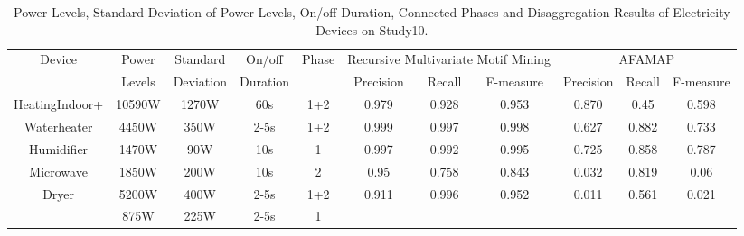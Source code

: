 \begin{table*}[!t]
\renewcommand{\arraystretch}{1.3}
\caption{Power Levels, Standard Deviation of Power Levels, On/off Duration, Connected Phases and Disaggregation Results of Electricity Devices on Study10.}
\label{table_study10results}
\centering
\small
\setlength\tabcolsep{2pt}
\begin{tabular}{|c|c|c|c|c|c|c|c|c|c|c|}
\hline
\multirow{2}{*}{Device} & Power & Standard & On/off &  \multirow{2}{*}{Phase} & \multicolumn{3}{|c|}{Recursive Multivariate Motif Mining} & \multicolumn{3}{|c|}{AFAMAP}\\
\cline{6-11}
           &  Levels & Deviation & Duration &  &Precision&  Recall &  F-measure & Precision & Recall & F-measure\\ 
\hline
\hline
\multirow{2}{*}{HeatingIndoor+} & \multirow{2}{*}{10590W} & \multirow{2}{*}{1270W} & \multirow{2}{*}{60s} & \multirow{2}{*}{1+2} & \multirow{2}{*}{0.979} & \multirow{2}{*}{0.928} & \multirow{2}{*}{0.953} & \multirow{2}{*}{0.870}& \multirow{2}{*}{0.45} & \multirow{2}{*}{0.598}\\
HeatingOutdoor &  &  &  &  &  &  &  &  & & \\
\hline
Waterheater & 4450W & 350W &  2-5s & 1+2 & 0.999 & 0.997 &0.998 &0.627& 0.882 &0.733\\
\hline
Humidifier & 1470W & 90W & 10s & 1 & 0.997 & 0.992 &0.995 & 0.725 & 0.858 & 0.787\\
\hline
Microwave & 1850W & 200W & 10s & 2 & 0.95 &0.758 & 0.843 & 0.032 & 0.819 & 0.06\\
\hline
\multirow{2}{*}{Dryer} & 5200W &400W & 2-5s & 1+2 & \multirow{2}{*}{0.911}&\multirow{2}{*}{0.996}&\multirow{2}{*}{0.952}& \multirow{2}{*}{0.011}&\multirow{2}{*}{0.561} & \multirow{2}{*}{0.021}\\
\cline{2-3} \cline{4-5}
                       & 875W &225W  & 2-5s & 1 & & & & & &\\
\hline
\end{tabular}
\end{table*}

